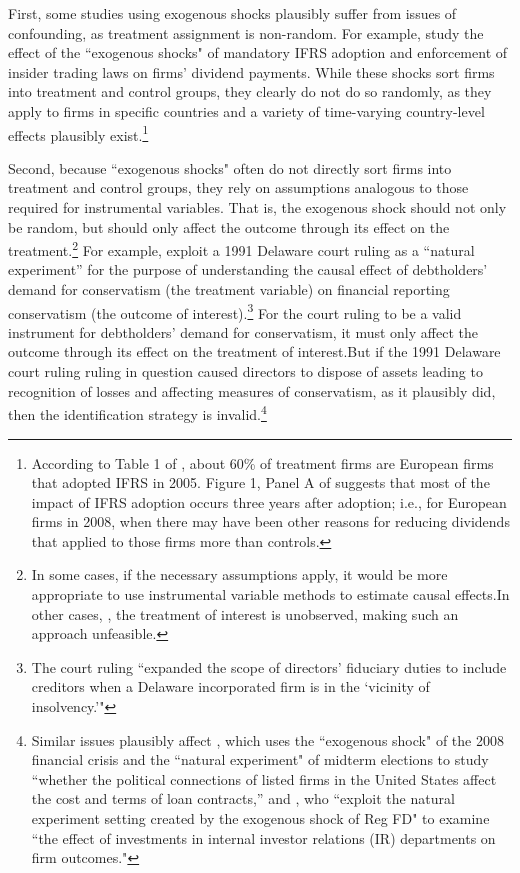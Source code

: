 \documentclass[12pt,reqno,titlepage]{amsart}
\begin{document}
\begin{doublespace}
First, some studies using exogenous shocks plausibly suffer from issues of confounding, as treatment assignment is non-random. For example, \citet{Hail:2014fq} study the effect of the ``exogenous shocks" of mandatory IFRS adoption and enforcement of insider trading laws on firms' dividend payments. While these shocks sort firms into treatment and control groups, they clearly do not do so randomly, as they apply to firms in specific countries and a variety of time-varying country-level effects plausibly exist.\footnote{According to Table 1 of \citet{Hail:2014fq}, about 60\% of treatment firms are European firms that adopted IFRS in 2005. Figure 1, Panel A of \citet{Hail:2014fq} suggests that most of the impact of IFRS adoption occurs three years after adoption; i.e., for European firms in 2008, when there may have been other reasons for reducing dividends that applied to those firms more than controls.}

Second, because ``exogenous shocks" often do not directly sort firms into treatment and control groups, they rely on assumptions analogous to those required for instrumental variables. That is, the exogenous shock should not only be random, but should only affect the outcome through its effect on the treatment.\footnote{In some cases, if the necessary assumptions apply, it would be more appropriate to use instrumental variable methods to estimate causal effects.In other cases, \citep[e.g.][]{Aier:2014ii}, the treatment of interest is unobserved, making such an approach unfeasible.} For example, \cite{Aier:2014ii} exploit a 1991 Delaware court ruling as a ``natural experiment'' for the purpose of understanding the causal effect of debtholders' demand for conservatism (the treatment variable) on financial reporting conservatism (the outcome of interest).\footnote{The court ruling ``expanded the scope of directors' fiduciary duties to include creditors when a Delaware incorporated firm is in the `vicinity of insolvency.'"} For the court ruling to be a valid instrument for debtholders' demand for conservatism, it must only affect the outcome through its effect on the treatment of interest.But if the 1991 Delaware court ruling  ruling in question caused directors to dispose of assets leading to recognition of losses and affecting measures of conservatism, as it plausibly did, then the identification strategy is invalid.\footnote{Similar issues plausibly affect \citet{Houston:2014hv}, which uses the ``exogenous shock" of the 2008 financial crisis and the ``natural experiment" of midterm elections to study ``whether the political connections of listed firms in the United States affect the cost and terms of loan contracts,'' and \citet{Kirk:2014gx}, who ``exploit the natural experiment setting created by the exogenous shock of Reg FD" to examine ``the effect of investments in internal investor relations (IR) departments on firm outcomes."} 


\end{doublespace}
\end{document}
